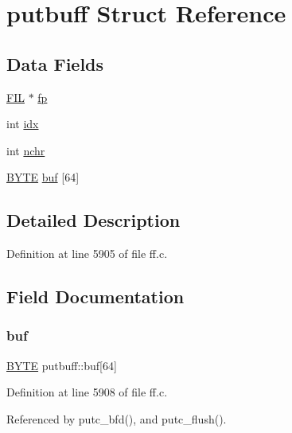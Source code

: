 \hypertarget{structputbuff}{}\section{putbuff Struct Reference}
\label{structputbuff}
\subsection*{Data Fields}
\begin{DoxyCompactItemize}
\item 
\hyperlink{structFIL}{F\+IL} $\ast$ \hyperlink{structputbuff_a5c7baa85e569be17f4888f5d92f4453c}{fp}
\item 
int \hyperlink{structputbuff_a10a3ca93af8df07e9836ebd5230c06d8}{idx}
\item 
int \hyperlink{structputbuff_a125366bfe48077e6f562f95e30b4604a}{nchr}
\item 
\hyperlink{integer_8h_a4ae1dab0fb4b072a66584546209e7d58}{B\+Y\+TE} \hyperlink{structputbuff_ae623199e5d2851f95050670170f20329}{buf} \mbox{[}64\mbox{]}
\end{DoxyCompactItemize}


\subsection{Detailed Description}


Definition at line 5905 of file ff.\+c.



\subsection{Field Documentation}
\mbox{\label{structputbuff_ae623199e5d2851f95050670170f20329}} 
\subsubsection{\texorpdfstring{buf}{buf}}
{\footnotesize\ttfamily \hyperlink{integer_8h_a4ae1dab0fb4b072a66584546209e7d58}{B\+Y\+TE} putbuff\+::buf\mbox{[}64\mbox{]}}



Definition at line 5908 of file ff.\+c.



Referenced by putc\+\_\+bfd(), and putc\+\_\+flush().

\mbox{\label{structputbuff_a5c7baa85e569be17f4888f5d92f4453c}} 
